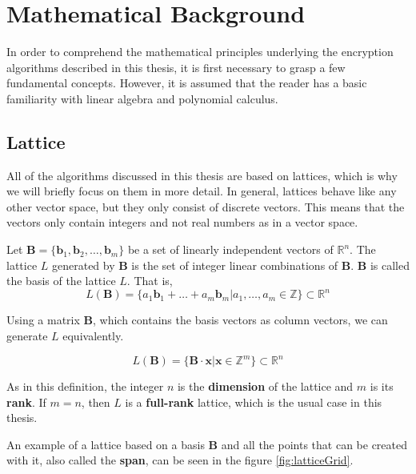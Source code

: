 \chapter{Mathematical Background}
\label{MathBack}

In order to comprehend the mathematical principles underlying the encryption algorithms described in this thesis, it is first necessary to grasp a few fundamental concepts. However, it is assumed that the reader has a basic familiarity with linear algebra and polynomial calculus.

\section{Lattice}


All of the algorithms discussed in this thesis are based on lattices, which is why we will briefly focus on them in more detail. In general, lattices behave like any other vector space, but they only consist of discrete vectors. This means that the vectors only contain integers and not real numbers as in a vector space.

Let $\textbf{B} = \{\textbf{b}_1, \textbf{b}_2, \ldots, \textbf{b}_m\}$ be a set of linearly independent vectors of $\mathbb{R}^n$. The lattice $\textit{L}$ generated by $\textbf{B}$ is the set of integer linear combinations of $\textbf{B}$. $\textbf{B}$ is called the basis of the lattice $\textit{L}$. That is,
$$L(\textbf{B}) = \{a_1\textbf{b}_1 + \ldots + a_m\textbf{b}_m | a_1, \ldots, a_m \in \mathbb{Z}  \} \subset \mathbb{R}^n$$


Using a matrix $\textbf{B}$, which contains the basis vectors as column vectors, we can generate $\textit{L}$ equivalently.

$$L(\textbf{B}) = \{\textbf{B}\cdot\textbf{x} | \textbf{x} \in \mathbb{Z}^m  \} \subset \mathbb{R}^n$$

As in this definition, the integer $n$ is the \textbf{dimension} of the lattice and $m$ is its \textbf{rank}. If $m = n$, then $\textit{L}$ is a \textbf{full-rank} lattice, which is the usual case in this thesis. 

An example of a lattice based on a basis $\textbf{B}$ and all the points that can be created with it, also called the \textbf{span}, can be seen in the figure \ref{fig:latticeGrid}.

